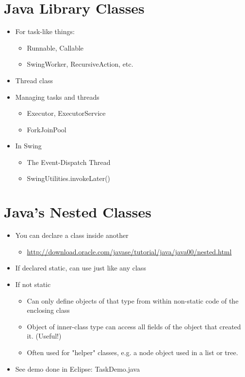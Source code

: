 \documentclass[12pt, a4paper]{book}
\begin{document}
\section{Java Library Classes}
\begin{itemize}
    \item For task-like things:
          \begin{itemize}
              \item Runnable, Callable
              \item SwingWorker, RecursiveAction, etc.
          \end{itemize}
    \item Thread class
    \item Managing tasks and threads
          \begin{itemize}
              \item Executor, ExecutorService
              \item ForkJoinPool
          \end{itemize}
    \item In Swing
          \begin{itemize}
              \item The Event-Dispatch Thread
              \item SwingUtilities.invokeLater()
          \end{itemize}
\end{itemize}
\section{Java's Nested Classes}
\begin{itemize}
    \item You can declare a class inside another
          \begin{itemize}
              \item \url{http://download.oracle.com/javase/tutorial/java/java00/nested.html}
          \end{itemize}
    \item If declared static, can use just like any class
    \item If not static
          \begin{itemize}
              \item Can only define objects of that type from within non-static code of the enclosing class
              \item Object of inner-class type can access all fields of the object that created it. (Useful!)
              \item  Often used for "helper" classes, e.g. a node object used in a list or tree.
          \end{itemize}
    \item See demo done in Eclipse: TaskDemo.java
\end{itemize}
\end{document}
